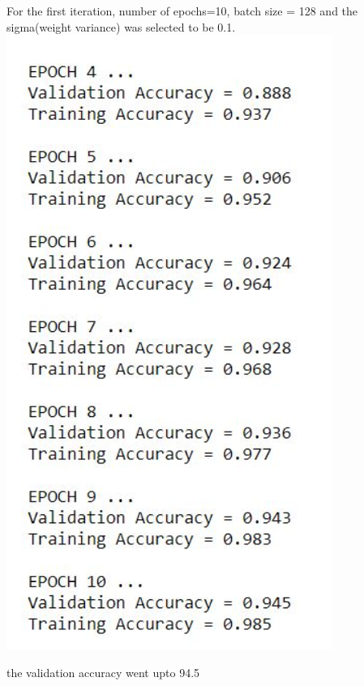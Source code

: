 \documentclass[11pt]{article}
\makeatletter
\def\maxwidth{\ifdim\Gin@nat@width>\linewidth\linewidth
    \else\Gin@nat@width\fi}
\let\Oldincludegraphics\includegraphics
\renewcommand{\includegraphics}[1]{\Oldincludegraphics[width=.8\maxwidth]{#1}}
\makeatother
\begin{document}
For the first iteration, number of epochs=10, batch size = 128 and the
sigma(weight variance) was selected to be 0.1.
\includegraphics{iteration1.PNG}

the validation accuracy went upto 94.5
\end{document}
